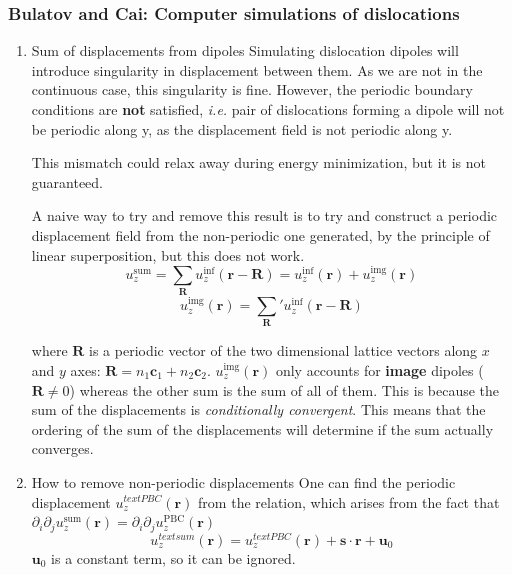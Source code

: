 \documentclass[11pt]{article}
\begin{document}
\subsubsection{Bulatov and Cai: Computer simulations of dislocations}
\label{sec-2-1-2}

\begin{enumerate}
\item Sum of displacements from dipoles
\label{sec-2-1-2-1}
Simulating dislocation dipoles will introduce singularity in displacement
between them. As we are not in the continuous case, this singularity is
fine. However, the periodic boundary conditions are \textbf{not} satisfied,
\emph{i.e.} pair of dislocations forming a dipole will not be periodic
along y, as the displacement field is not periodic along y. 

This mismatch could relax away during energy minimization, but it is not
guaranteed. 

A naive way to try and remove this result is to try and construct a
periodic displacement field from the non-periodic one generated, by the
principle of linear superposition, but this does not work. 
\[ u_{z}^{\text{sum}} = \sum_{\mathbf{R}} u_{z}^{\inf}(\mathbf{r}
     -\mathbf{R}) = u_{z}^{\inf}(\mathbf{r}) + u_{z}^{\text{img}}(\mathbf{r})
     \]
\[  u_{z}^{\text{img}}(\mathbf{r}) = \sum_{\mathbf{R}}' u_{z}^{\inf}(\mathbf{r}
     -\mathbf{R}) \]

where $\mathbf{R}$ is a periodic vector of the two dimensional lattice
vectors along $x$ and $y$ axes: $\mathbf{R} = n_{1}\mathbf{c}_1 +
     n_{2}\mathbf{c}_2$.
$u_{z}^{\text{img}}(\mathbf{r})$ only accounts for \textbf{image} dipoles
($\mathbf{R}\neq 0$)
whereas the other sum is the sum of all of them. 
This is because the sum of the displacements is \emph{conditionally
convergent}. This means that the ordering of the sum of the displacements
will determine if the sum actually converges.

\item How to remove non-periodic displacements
\label{sec-2-1-2-2}
One can find the periodic displacement $u_{z}^{text{PBC}}(\mathbf{r})$
from the relation, which arises from the fact that
$\partial_{i}\partial_{j}u_{z}^{\text{sum}}(\mathbf{r}) = \partial_{i}\partial_{j}u_{z}^{\text{PBC}}(\mathbf{r})$
\[ u_{z}^{text{sum}}(\mathbf{r}) =  u_{z}^{text{PBC}}(\mathbf{r}) +
     \mathbf{s}\cdot\mathbf{r} + \mathbf{u}_{0} \]
$\mathbf{u}_{0}$ is a constant term, so it can be ignored. 


\end{enumerate}
\end{document}
